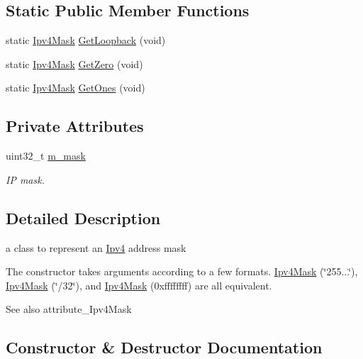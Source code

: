 \subsection*{Static Public Member Functions}
\begin{DoxyCompactItemize}
\item 
static \hyperlink{classns3_1_1Ipv4Mask}{Ipv4\+Mask} \hyperlink{classns3_1_1Ipv4Mask_a7842be570f11b3ffcf3a50b0639bcf2d}{Get\+Loopback} (void)
\item 
static \hyperlink{classns3_1_1Ipv4Mask}{Ipv4\+Mask} \hyperlink{classns3_1_1Ipv4Mask_ac2dda492011ede8350008d753d278998}{Get\+Zero} (void)
\item 
static \hyperlink{classns3_1_1Ipv4Mask}{Ipv4\+Mask} \hyperlink{classns3_1_1Ipv4Mask_af712cbdf28c039025d4aa45fa7e243dd}{Get\+Ones} (void)
\end{DoxyCompactItemize}
\subsection*{Private Attributes}
\begin{DoxyCompactItemize}
\item 
uint32\+\_\+t \hyperlink{classns3_1_1Ipv4Mask_a0c365f0f8f1db9d65792f4a21aa25f2a}{m\+\_\+mask}
\begin{DoxyCompactList}\small\item\em IP mask. \end{DoxyCompactList}\end{DoxyCompactItemize}


\subsection{Detailed Description}
a class to represent an \hyperlink{classns3_1_1Ipv4}{Ipv4} address mask 

The constructor takes arguments according to a few formats. \hyperlink{classns3_1_1Ipv4Mask}{Ipv4\+Mask} (\char`\"{}255...\char`\"{}), \hyperlink{classns3_1_1Ipv4Mask}{Ipv4\+Mask} (\char`\"{}/32\char`\"{}), and \hyperlink{classns3_1_1Ipv4Mask}{Ipv4\+Mask} (0xffffffff) are all equivalent.

\begin{DoxySeeAlso}{See also}
attribute\+\_\+\+Ipv4\+Mask 
\end{DoxySeeAlso}


\subsection{Constructor \& Destructor Documentation}

